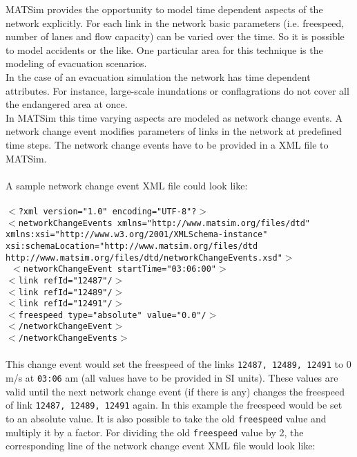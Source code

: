 \documentclass[a4paper,11pt]{report}
\begin{document}
MATSim provides the opportunity to model time dependent aspects of  the network explicitly. For each link in the network basic parameters  (i.e. freespeed, number of lanes and flow capacity) can be varied over  the time. So it is possible to model accidents or the like. One  particular area for this technique is the modeling of evacuation  scenarios.
\\  In the case of an evacuation simulation the network has time dependent  attributes. For instance, large-scale inundations or conflagrations do  not cover all the endangered area at once.
\\  In MATSim this time varying aspects are modeled as network change  events. A network change event modifies parameters of links in the  network at predefined time steps. The network change events have to be  provided in a XML file to MATSim.
\\
\\  A sample network change event XML file could look like:
\\
\\
\texttt{$<$?xml version="1.0" encoding="UTF-8"?$>$
\\  $<$networkChangeEvents xmlns="http://www.matsim.org/files/dtd"  xmlns:xsi="http://www.w3.org/2001/XMLSchema-instance"  xsi:schemaLocation="http://www.matsim.org/files/dtd  http://www.matsim.org/files/dtd/networkChangeEvents.xsd"$>$}
\\
\texttt{ $<$networkChangeEvent startTime="03:06:00"$>$
\\   $<$link refId="12487"/$>$
\\   $<$link refId="12489"/$>$
\\   $<$link refId="12491"/$>$
\\   $<$freespeed type="absolute" value="0.0"/$>$
\\   $<$/networkChangeEvent$>$}
\\
\texttt{$<$/networkChangeEvents$>$}
\\
\\  This change event would set the freespeed of the links 
\texttt{12487, 12489, 12491} to 0 m/s at 
\texttt{03:06}  am (all values have to be provided in SI units). These values are valid  until the next network change event (if there is any) changes the  freespeed of link 
\texttt{12487, 12489, 12491} again. In this example the freespeed would be set to an absolute value. It is also possible to take the old 
\texttt{freespeed} value and multiply it by a factor. For dividing the old 
\texttt{freespeed} value by 2, the corresponding line of the network change event XML file would look like:
\end{document}
